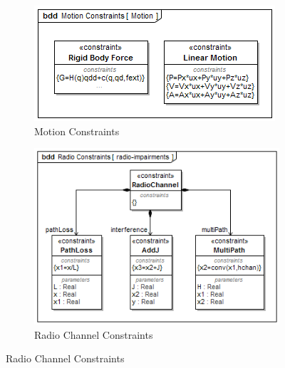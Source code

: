 \begin{figure}[ht]
	
	\centering
	
	\begin{subfigure}{.8\textwidth}
		\centering
		\includegraphics[width=.8\linewidth]{./chapter-sysml/diagrams/bdd__Motion_Constraints__Motion}  
		\caption{Motion Constraints}
		\label{sysml:fig:constraints:motion}
	\end{subfigure}

	\begin{subfigure}{.8\textwidth}
		\centering
		\includegraphics[width=.8\linewidth]{./chapter-sysml/diagrams/bdd__Radio_Constraints__radio-impairments}  
		\caption{Radio Channel Constraints}
		\label{sysml:fig:constraints:radio}
	\end{subfigure}
	

\end{figure}
